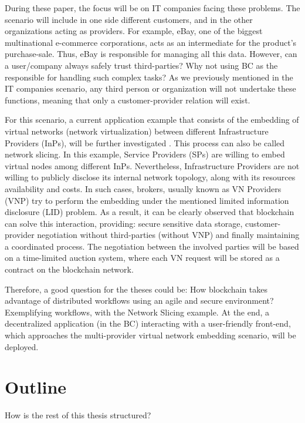 During these paper, the focus will be on IT companies facing these problems. The scenario will include in one side different customers, and in the other organizations acting as providers. For example, eBay, one of the biggest multinational e-commerce corporations, acts as an intermediate for the product's purchase-sale. Thus, eBay is responsible for managing all this data. However, can a user/company always safely trust third-parties? Why not using BC as the responsible for handling such complex tasks? As we previously mentioned in the IT companies scenario, any third person or organization will not undertake these functions, meaning that only a customer-provider relation will exist.

For this scenario, a current application example that consists of the embedding of virtual networks (network virtualization) between different Infrastructure Providers (InPs), will be further investigated \cite{dietrich2015multi}. This process can also be called network slicing. In this example, Service Providers (SPs) are willing to embed virtual nodes among different InPs. Nevertheless, Infrastructure Providers are not willing to publicly disclose its internal network topology, along with its resources availability and costs. In such cases, brokers, usually known as VN Providers (VNP) try to perform the embedding under the mentioned limited information disclosure (LID) problem. As a result, it can be clearly observed that blockchain can solve this interaction, providing: secure sensitive data storage, customer-provider negotiation without third-parties (without VNP) and finally maintaining a coordinated process. The negotiation between the involved parties will be based on a time-limited auction system, where each VN request will be stored as a contract on the blockchain network.

Therefore, a good question for the theses could be: How blockchain takes advantage of distributed workflows using an agile and secure environment? Exemplifying workflows, with the Network Slicing example. At the end, a decentralized application (in the BC) interacting with a user-friendly front-end, which approaches the multi-provider virtual network embedding scenario, will be deployed.


\section{Outline}
How is the rest of this thesis structured?



